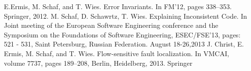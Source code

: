 \documentclass{article}
\begin{document}
\begin{thebibliography}{9}
E.Ermis, M. Schaf, and T. Wies. Error Invariants. In FM’12, pages 338–353. Springer, 2012.
M. Schaf, D. Schawrtz, T. Wies. Explaining Inconsistent Code. In Joint meeting of the European Software Engineering conference and the Symposium on the Foundations of Software Engineering, ESEC/FSE’13, pages: 521 - 531, Saint Petersburg, Russian Federation. August 18-26,2013 
J. Christ, E. Ermis, M. Schaf, and T. Wies. Flow-sensitive fault localization. In VMCAI, volume 7737, pages 189–208, Berlin, Heidelberg, 2013. Springer 
\end{thebibliography}
\end{document}
